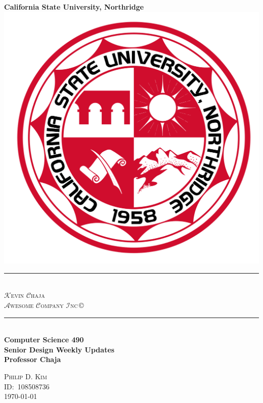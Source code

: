 \begin{titlepage}
  \newcommand{\HRule}{\rule{\linewidth}{0.5mm}}
  \center\Huge\textbf{California State University, Northridge}\\[2cm]
  \includegraphics[scale=0.2]{CSUNS.svg.png}\\[1cm]
  \HRule\  \\[0.4cm]
  {\huge\textsc{\(\mathcal{K}\)evin \(\mathcal{C}\)haja\\ \(\mathcal{A}\)wesome \(\mathcal{C}\)ompany \(\mathcal{I}\)nc}\,\footnotesize\copyright}\\[0.4cm]
  \HRule\  \\[1.4cm]
  \Large\textbf{Computer Science 490\\Senior Design Weekly Updates}\\[0.5cm]
  \large\textbf{Professor Chaja}
  \vfill
  \begin{minipage}{0.4\textwidth}
  \large\centering\textsc{Philip D. Kim}\\
  \textsc{ID:\ 108508736}\\
  \textsc{\today}
  \end{minipage}
\end{titlepage}